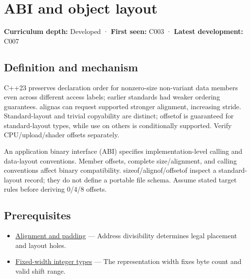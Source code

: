\hypertarget{appendix-c4ac6bb0fff8}{}\label{referencestart:appendix-c4ac6bb0fff8}
\section{ABI and object layout}\label{appendix-c4ac6bb0fff8-abi-and-object-layout}

\hypertarget{appendix-c4ac6bb0fff8-abi-and-object-layout}{}

\textbf{Curriculum depth:} Developed · \textbf{First seen:} C003 · \textbf{Latest development:} C007

\begin{allmightroledefinition}

\subsection{Definition and mechanism}\label{appendix-c4ac6bb0fff8-definition-and-mechanism}

\hypertarget{appendix-c4ac6bb0fff8-definition-and-mechanism}{}

C++23 preserves declaration order for nonzero-size non-variant data members even across different access labels; earlier standards had weaker ordering guarantees. alignas can request supported stronger alignment, increasing stride. Standard-layout and trivial copyability are distinct; offsetof is guaranteed for standard-layout types, while use on others is conditionally supported. Verify CPU/upload/shader offsets separately.

\end{allmightroledefinition}

An application binary interface (ABI) specifies implementation-level calling and data-layout conventions. Member offsets, complete size/alignment, and calling conventions affect binary compatibility. sizeof/alignof/offsetof inspect a standard-layout record; they do not define a portable file schema. Assume stated target rules before deriving 0/4/8 offsets.

\subsection{Prerequisites}\label{appendix-c4ac6bb0fff8-prerequisites}

\hypertarget{appendix-c4ac6bb0fff8-prerequisites}{}

\begin{itemize}
\tightlist
\item
  \hyperref[appendix-a1f7c53b4742]{Alignment and padding} --- Address divisibility determines legal placement and layout holes.
\item
  \hyperref[appendix-cc04044b5782]{Fixed-width integer types} --- The representation width fixes byte count and valid shift range.
\end{itemize}

